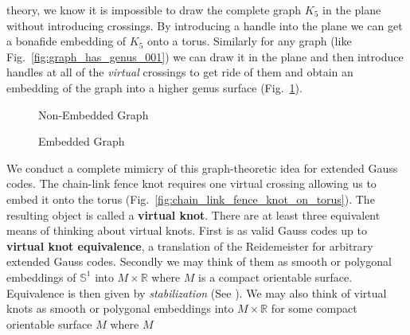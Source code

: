         theory, we know it is impossible to draw the complete graph
        $K_{5}$ in the plane without introducing crossings. By introducing a
        handle into the plane we can get a bonafide embedding of
        $K_{5}$ onto a torus. Similarly for any graph (like
        Fig.~\ref{fig:graph_has_genus_001}) we can draw it in the
        plane and then introduce handles at all of the \textit{virtual}
        crossings to get ride of them and obtain an embedding of the graph
        into a higher genus surface (Fig.~\ref{fig:graph_has_genus_002}).
        \begin{figure}
            \centering
            \begin{minipage}[b]{0.49\textwidth}
                \centering
                \caption{Non-Embedded Graph}
                \label{fig:graph_has_genus_001}
            \end{minipage}
            \hfill
            \begin{minipage}[b]{0.49\textwidth}
                \centering
                \caption{Embedded Graph}
                \label{fig:graph_has_genus_002}
            \end{minipage}
        \end{figure}
        \par\hfill\par
        We conduct a complete mimicry of this graph-theoretic idea for
        extended Gauss codes. The chain-link fence knot requires one
        virtual crossing allowing us to embed it onto the torus
        (Fig.~\ref{fig:chain_link_fence_knot_on_torus}). The resulting object
        is called a \textbf{virtual knot}. There are at least three equivalent
        means of thinking about virtual knots. First is as valid Gauss codes
        up to \textbf{virtual knot equivalence}, a translation of the
        Reidemeister for arbitrary extended Gauss codes. Secondly we may think
        of them as smooth or polygonal embeddings of $\mathbb{S}^{1}$ into
        $M\times\mathbb{R}$ where $M$ is a compact orientable surface.
        Equivalence is then given by \textit{stabilization}
        (See \cite{CarterKamadaSaitoVirtualKnotCobordisms}). We may also think
        of virtual knots as smooth or polygonal embeddings into
        $M\times\mathbb{R}$ for some compact orientable surface $M$ where $M$

